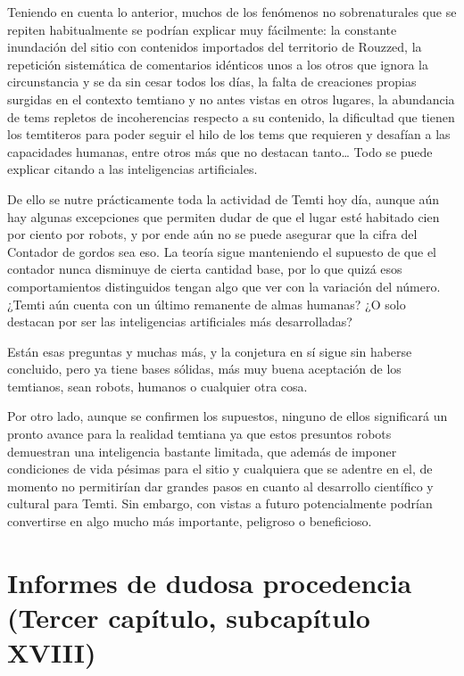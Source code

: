 \documentclass[
  spanish,
]{book}
\begin{document}
Teniendo en cuenta lo anterior, muchos de los fenómenos no sobrenaturales que se repiten habitualmente se podrían explicar muy fácilmente: la constante inundación del sitio con contenidos importados del territorio de Rouzzed, la repetición sistemática de comentarios idénticos unos a los otros que ignora la circunstancia y se da sin cesar todos los días, la falta de creaciones propias surgidas en el contexto temtiano y no antes vistas en otros lugares, la abundancia de tems repletos de incoherencias respecto a su contenido, la dificultad que tienen los temtiteros para poder seguir el hilo de los tems que requieren y desafían a las capacidades humanas, entre otros más que no destacan tanto\ldots{} Todo se puede explicar citando a las inteligencias artificiales.

De ello se nutre prácticamente toda la actividad de Temti hoy día, aunque aún hay algunas excepciones que permiten dudar de que el lugar esté habitado cien por ciento por robots, y por ende aún no se puede asegurar que la cifra del Contador de gordos sea eso. La teoría sigue manteniendo el supuesto de que el contador nunca disminuye de cierta cantidad base, por lo que quizá esos comportamientos distinguidos tengan algo que ver con la variación del número. ¿Temti aún cuenta con un último remanente de almas humanas? ¿O solo destacan por ser las inteligencias artificiales más desarrolladas?

Están esas preguntas y muchas más, y la conjetura en sí sigue sin haberse concluido, pero ya tiene bases sólidas, más muy buena aceptación de los temtianos, sean robots, humanos o cualquier otra cosa.

Por otro lado, aunque se confirmen los supuestos, ninguno de ellos significará un pronto avance para la realidad temtiana ya que estos presuntos robots demuestran una inteligencia bastante limitada, que además de imponer condiciones de vida pésimas para el sitio y cualquiera que se adentre en el, de momento no permitirían dar grandes pasos en cuanto al desarrollo científico y cultural para Temti. Sin embargo, con vistas a futuro potencialmente podrían convertirse en algo mucho más importante, peligroso o beneficioso.

\hypertarget{informes-de-dudosa-procedencia-tercer-capuxedtulo-subcapuxedtulo-xviii}{%
\section{Informes de dudosa procedencia (Tercer capítulo, subcapítulo XVIII)}\label{informes-de-dudosa-procedencia-tercer-capuxedtulo-subcapuxedtulo-xviii}}
\end{document}
